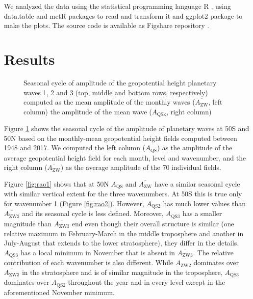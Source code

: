 \documentclass[draft,linenumbers]{agujournal2018}
\begin{document}
We analyzed the data using the statistical programming language R
\citep{R-base}, using data.table \citep{R-data.table} and metR
\citep{R-metR} packages to read and transform it and ggplot2 package
\citep{R-ggplot2} to make the plots. The source code is available as
Figshare repository \citep{Campitelli2019-figshare}.

\section{Results}

\begin{figure}[h]

{\centering {}\newline{}

}

\caption{Seasonal cycle of amplitude of the geopotential height planetary waves 1, 2 and 3 (top, middle and bottom rows, respectively) computed as the mean amplitude of the monthly waves ($\overline{A_\mathrm{ZW} }$, left column) the amplitude of the mean wave ($A_\mathrm{QSk}$, right column)}\label{fig:rao}
\end{figure}

Figure \ref{fig:rao} shows the seasonal cycle of the amplitude of
planetary waves at 50\degree S and 50\degree N based on the monthly-mean
geopotential height fields computed between 1948 and 2017. We computed
the left column (\(A_\mathrm{QS}\)) as the amplitude of the average
geopotential height field for each month, level and wavenumber, and the
right column (\(\overline{A_\mathrm{ZW}}\)) as the average amplitude of
the 70 individual fields.

Figure \ref{fig:rao1} shows that at 50\degree N \(A_\mathrm{QS}\) and
\(\overline{A_\mathrm{ZW}}\) have a similar seasonal cycle with similar
vertical extent for the three wavenumbers. At 50\degree S this is true
only for wavenumber 1 (Figure \ref{fig:rao2}). However,
\(A_\mathrm{QS2}\) has much lower values than
\(\overline{A_\mathrm{ZW2}}\) and its seasonal cycle is less defined.
Moreover, \(A_\mathrm{QS3}\) has a smaller magnitude than
\(\overline{A_\mathrm{ZW3}}\) end even though their overall structure is
similar (one relative maximum in February-March in the middle
troposphere and another in July-August that extends to the lower
stratosphere), they differ in the details. \(A_\mathrm{QS3}\) has a
local minimum in November that is absent in
\(\overline{A_\mathrm{ZW3}}\). The relative contribution of each
wavenumber is also different. While \(\overline{A_\mathrm{ZW2}}\)
dominates over \(\overline{A_\mathrm{ZW3}}\) in the stratosphere and is
of similar magnitude in the troposphere, \(A_\mathrm{QS3}\) dominates
over \(A_\mathrm{QS2}\) throughout the year and in every level except in
the aforementioned November minimum.
\end{document}
